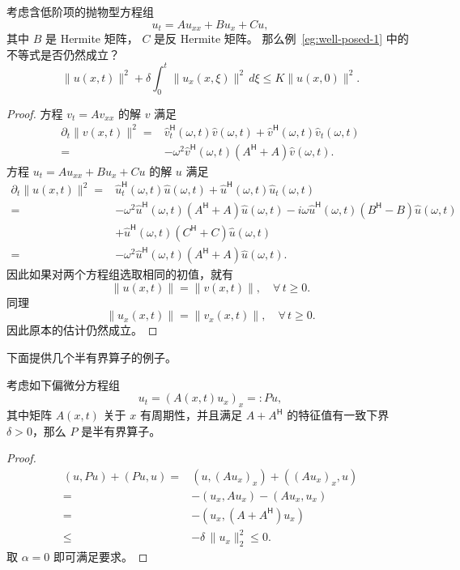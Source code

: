 \begin{example}
    考虑含低阶项的抛物型方程组
    \[
        u_t = A u_{xx} + B u_x + C u,
    \]
    其中 $B$ 是 Hermite 矩阵， $C$ 是反 Hermite 矩阵。
    那么例~\ref{eg:well-posed-1} 中的不等式是否仍然成立？
    \[
        \| u(x,t) \|^2 + \delta \int_0^t \| u_x(x,\xi) \|^2 \,d\xi \le K \| u(x,0) \|^2.
    \]
\end{example}

\begin{proof}
    方程 $v_t = A v_{xx}$ 的解 $v$ 满足
    \begin{align*}
        \partial_t \| v(x,t) \|^2
        ={} & \hat{v}_t^\mathsf{H}(\omega,t) \hat{v}(\omega,t) + \hat{v}^\mathsf{H}(\omega,t) \hat{v}_t(\omega,t) \\
        ={} & - \omega^2 \hat{v}^\mathsf{H}(\omega,t) (A^\mathsf{H} + A) \hat{v}(\omega,t).
    \end{align*}
    方程 $u_t = A u_{xx} + B u_x + C u$ 的解 $u$ 满足
    \begin{align*}
        \partial_t \| u(x,t) \|^2
        ={} & \hat{u}_t^\mathsf{H}(\omega,t) \hat{u}(\omega,t) + \hat{u}^\mathsf{H}(\omega,t) \hat{u}_t(\omega,t) \\
        ={} & - \omega^2 \hat{u}^\mathsf{H}(\omega,t) (A^\mathsf{H} + A) \hat{u}(\omega,t)
        - i \omega \hat{u}^\mathsf{H}(\omega,t) (B^\mathsf{H} - B) \hat{u}(\omega,t)                              \\
            & + \hat{u}^\mathsf{H}(\omega,t)(C^\mathsf{H} + C) \hat{u}(\omega,t)                                  \\
        ={} & - \omega^2 \hat{u}^\mathsf{H}(\omega,t) (A^\mathsf{H} + A) \hat{u}(\omega,t).
    \end{align*}
    因此如果对两个方程组选取相同的初值，就有
    \[
        \| u(x,t) \| = \| v(x,t) \|,\quad \forall\, t \ge 0.
    \]
    同理
    \[
        \| u_x(x,t) \| = \| v_x(x,t) \|,\quad \forall\, t \ge 0.
    \]
    因此原本的估计仍然成立。
\end{proof}

下面提供几个半有界算子的例子。

\begin{example}
    考虑如下偏微分方程组
    \[
        u_t = (A(x,t) u_x)_x =: P u,
    \]
    其中矩阵 $A(x,t)$ 关于 $x$ 有周期性，并且满足 $A + A^{\mathsf{H}}$ 的特征值有一致下界 $\delta > 0$，那么 $P$ 是半有界算子。
\end{example}

\begin{proof}
    \begin{align*}
        (u, P u) + (P u, u) ={} & (u, (A u_x)_x) + ((A u_x)_x, u)
        \\
        ={}                     & -(u_x, A u_x) - (A u_x, u_x)    \\
        ={}                     & -(u_x, (A+A^{\mathsf{H}})u_x)   \\
        \le                     & -\delta \, \|u_x\|_2^2 \le 0.
    \end{align*}
    取 $\alpha = 0$ 即可满足要求。
\end{proof}

